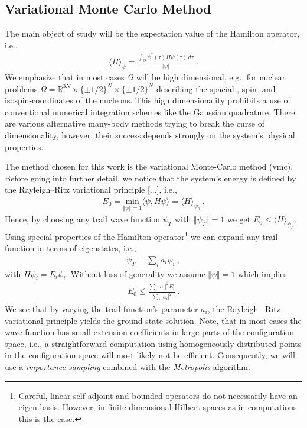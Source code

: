 \documentclass[11pt,a4paper]{article}
\numberwithin{equation}{section}
\begin{document}
\subsection{Variational Monte Carlo Method}
%
%
The main object of study will be the expectation value of the Hamilton operator, i.e.,
\begin{align*}
\langle H \rangle_{\psi} = \frac{\int_{\Omega}\psi^*(\tau) H \psi(\tau)\, d\tau}{\Vert \psi \Vert}~.
\end{align*}
We emphasize that in most cases $\Omega$ will be high dimensional, e.g., for nuclear problems $\Omega = \mathbb{R}^{3N}\times \{\pm 1/2\}^{N} \times \{\pm 1/2\}^{N}$ describing the spacial-, spin- and isospin-coordinates of the nucleons. 
%
This high dimensionality prohibits a use of conventional numerical integration schemes like the Gaussian quadrature.
%
There are various alternative many-body methods trying to break the curse of dimensionality, however, their success depends strongly on the system's physical properties.

%
The method chosen for this work is the variational Monte-Carlo method (vmc). Before going into further detail, we notice that the system's energy is defined by the Rayleigh--Ritz variational principle [...], i.e.,
\begin{align*}
E_0 = \underset{\Vert \psi \Vert=1}{\mathrm{min}}\langle \psi ,H \psi\rangle=\langle H \rangle_{\psi_0} ~.
\end{align*} 
Hence, by choosing any trail wave function $\psi_T$ with $\Vert \psi_T\Vert =1$ we get $E_0\leq \langle H \rangle_{\psi_T }$.
%
Using special properties of the Hamilton operator\footnote{
Careful, linear self-adjoint and bounded operators do not necessarily have an eigen-basis. However, in finite dimensional Hilbert spaces as in computations this is the case.
} we can expand any trail function in terms of eigenstates, i.e.,
\begin{align*}
\psi_T=\sum_{i}a_i\psi_i~,
\end{align*}
with $H\psi_i = E_i \psi_i$.
%
Without loss of generality we assume $\Vert \psi \Vert = 1$ which implies
\begin{align*}
E_0\leq \frac{\sum_{i}|a_i|^2E_i}{\sum_{i}|a_i|^2}~.
\end{align*}
We see that by varying the trail function's parameter $a_i$, the Rayleigh --Ritz variational principle yields the ground state solution.
%
Note, that in most cases the wave function has small extension coefficients in large parts of the configuration space, i.e., a straightforward computation using homogeneously distributed points in the configuration space will most likely not be efficient.  
%
Consequently, we will use a \textit{importance sampling} combined with the \textit{Metropolis} algorithm.
\end{document}
